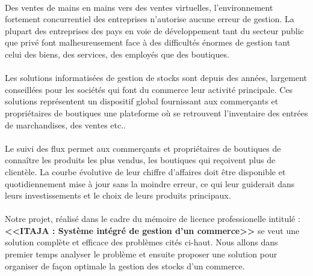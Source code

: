 \introduction

\paragraph{}
  Des ventes de mains en mains vers des ventes virtuelles, l'environnement fortement concurrentiel des entreprises n'autorise aucune erreur de gestion. La plupart des entreprises des pays en voie de développement tant du secteur public que privé font malheureusement face à des difficultés énormes de gestion tant celui des biens, des services, des employés que des boutiques.

\paragraph{}
  Les solutions informatisées de gestion de stocks sont depuis des années, largement conseillées pour les sociétés qui font du commerce leur activité principale. Ces solutions représentent un dispositif global fournissant aux commerçants et propriétaires de boutiques une plateforme où se retrouvent l'inventaire des entrées de marchandises, des ventes etc..

\paragraph{}
  Le suivi des flux permet aux commerçants et propriétaires de boutiques de connaître les produits les plus vendus, les boutiques qui reçoivent plus de clientèle. La courbe évolutive de leur chiffre d'affaires doit être disponible et quotidiennement mise à jour sans la moindre erreur, ce qui leur guiderait dans leurs investissements et le choix de leurs produits principaux.

\paragraph{}
  Notre projet, réalisé dans le cadre du mémoire de licence professionelle intitulé : \textbf{<<ITAJA : Système intégré de gestion d’un commerce>>} se veut une solution complète et efficace des problèmes cités ci-haut. Nous allons dans premier temps analyser le problème et ensuite proposer une solution pour organiser de façon optimale la gestion des stocks d'un commerce.